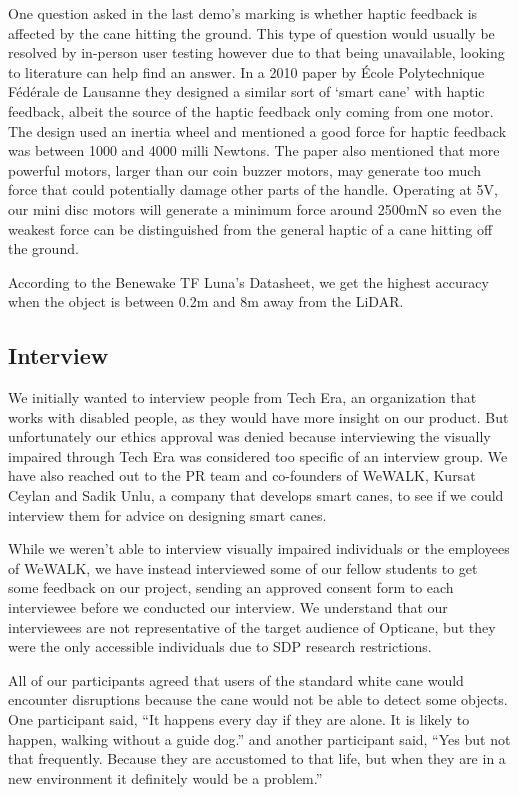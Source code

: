 \documentclass{article}
\begin{document}
One question asked in the last demo’s marking is whether haptic feedback is affected by the cane hitting the ground. This type of question would usually be resolved by in-person user testing however due to that being unavailable, looking to literature can help find an answer. In a 2010 paper by École Polytechnique Fédérale de Lausanne they designed a similar sort of ‘smart cane’ with haptic feedback, albeit the source of the haptic feedback only coming from one motor. \cite{14gallo} The design used an inertia wheel and mentioned a good force for haptic feedback was between 1000 and 4000 milli Newtons. The paper also mentioned that more powerful motors, larger than our coin buzzer motors, may generate too much force that could potentially damage other parts of the handle. Operating at 5V, our mini disc motors will generate a minimum force around 2500mN so even the weakest force can be distinguished from the general haptic of a cane hitting off the ground. \cite{15rsOnline}
 
According to the Benewake TF Luna's Datasheet, we get the highest accuracy when the object is between 0.2m and 8m away from the LiDAR. \cite{19mouser}

\subsection{Interview}

We initially wanted to interview people from Tech Era, an organization that works with disabled people, as they would have more insight on our product. But unfortunately our ethics approval was denied because interviewing the visually impaired through Tech Era was considered too specific of an interview group. We have also reached out to the PR team and co-founders of WeWALK, Kursat Ceylan and Sadik Unlu, a company that develops smart canes, to see if we could interview them for advice on designing smart canes. \cite{2wewalk}

While we weren't able to interview visually impaired individuals or the employees of WeWALK, we have instead interviewed some of our fellow students to get some feedback on our project, sending an approved consent form to each interviewee before we conducted our interview. We understand that our interviewees are not representative of the target audience of Opticane, but they were the only accessible individuals due to SDP research restrictions.

All of our participants agreed that users of the standard white cane would encounter disruptions because the cane would not be able to detect some objects. One participant said, “It happens every day if they are alone. It is likely to happen, walking without a guide dog.” and another participant said, “Yes but not that frequently. Because they are accustomed to that life, but when they are in a new environment it definitely would be a problem.”
\end{document}
